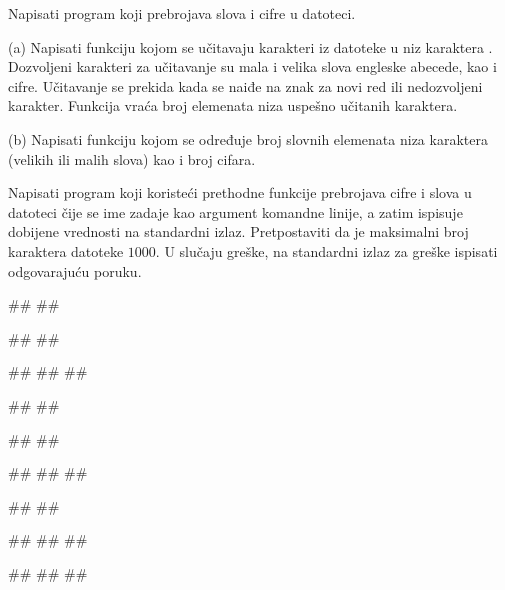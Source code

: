 \begin{Exercise}[label=p3_x4]         
Napisati program koji prebrojava slova i cifre u datoteci.
\begin{description}
\item{(a)} Napisati funkciju 
  kojom se učitavaju karakteri iz datoteke  u niz karaktera . Dozvoljeni karakteri za učitavanje su mala i
  velika slova engleske abecede, kao i cifre.  Učitavanje se prekida kada se naiđe
  na znak za novi red ili nedozvoljeni karakter. Funkcija vraća broj elemenata niza uspešno učitanih karaktera.
\item{(b)} Napisati funkciju
   kojom se
  određuje broj slovnih elemenata niza karaktera (velikih ili malih slova)
  kao i broj cifara.
\end{description}
Napisati program koji koristeći prethodne funkcije prebrojava cifre i slova u datoteci 
čije se ime zadaje kao argument komandne linije, a zatim ispisuje dobijene vrednosti na standardni izlaz.
Pretpostaviti da je maksimalni broj karaktera datoteke $1000$.
U slučaju greške, na standardni izlaz za greške ispisati odgovarajuću poruku.

\begin{minitest}
\begin{upotreba}{1}
#\naslovPokretanje#
##

##
##

#\naslovIzlaz#
##
##
\end{upotreba}
\end{minitest}
\begin{minitest}
\begin{upotreba}{2}
#\naslovPokretanje#
##

##
##

#\naslovIzlaz#
##
##
\end{upotreba}
\end{minitest}
\begin{minitest}
\begin{upotreba}{3}
#\naslovPokretanje#
##

##
##
##

#\naslovIzlaz#
##
##
\end{upotreba}
\end{minitest}


\end{Exercise}
